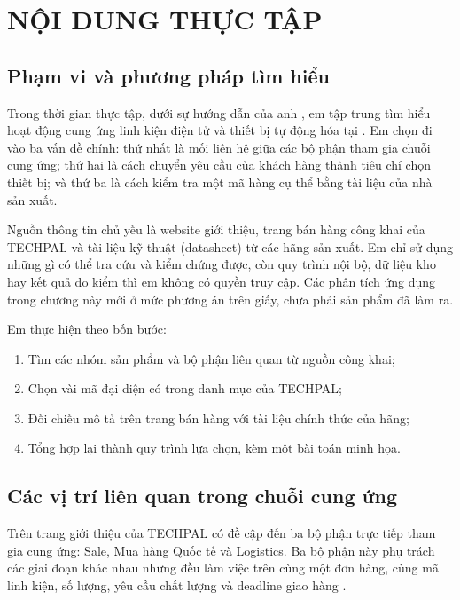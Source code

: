 \chapter{NỘI DUNG THỰC TẬP}

\section{Phạm vi và phương pháp tìm hiểu}

Trong thời gian thực tập, dưới sự hướng dẫn của anh \CompanySupervisor{}, em tập
trung tìm hiểu hoạt động cung ứng linh kiện điện tử và thiết bị tự động hóa tại
\CompanyName{}. Em chọn đi vào ba vấn đề chính: thứ nhất là mối liên hệ giữa các
bộ phận tham gia chuỗi cung ứng; thứ hai là cách chuyển yêu cầu của khách hàng
thành tiêu chí chọn thiết bị; và thứ ba là cách kiểm tra một mã hàng cụ thể bằng
tài liệu của nhà sản xuất.

Nguồn thông tin chủ yếu là website giới thiệu, trang bán hàng công khai của
TECHPAL và tài liệu kỹ thuật (datasheet) từ các hãng sản xuất. Em chỉ sử dụng
những gì có thể tra cứu và kiểm chứng được, còn quy trình nội bộ, dữ liệu kho
hay kết quả đo kiểm thì em không có quyền truy cập. Các phân tích ứng dụng trong
chương này mới ở mức phương án trên giấy, chưa phải sản phẩm đã làm ra.

Em thực hiện theo bốn bước:

\begin{enumerate}[label=\arabic*)]
  \item Tìm các nhóm sản phẩm và bộ phận liên quan từ nguồn công khai;
  \item Chọn vài mã đại diện có trong danh mục của TECHPAL;
  \item Đối chiếu mô tả trên trang bán hàng với tài liệu chính thức của hãng;
  \item Tổng hợp lại thành quy trình lựa chọn, kèm một bài toán minh họa.
\end{enumerate}

\section{Các vị trí liên quan trong chuỗi cung ứng}

Trên trang giới thiệu của TECHPAL có đề cập đến ba bộ phận trực tiếp tham gia
cung ứng: Sale, Mua hàng Quốc tế và Logistics. Ba bộ phận
này phụ trách các giai đoạn khác nhau nhưng đều làm việc trên cùng một đơn hàng,
cùng mã linh kiện, số lượng, yêu cầu chất lượng và deadline giao hàng
\cite{techpal-about}.

